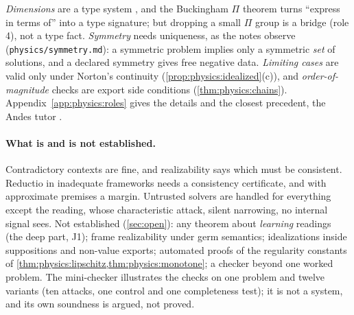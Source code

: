 \emph{Dimensions} are a type system \citep{kennedy1994dimension}, and the Buckingham $\Pi$
theorem \citep{buckingham1914physically} turns ``express in terms of'' into a type
signature; but dropping a small $\Pi$ group is a bridge (role 4), not a type fact.
\emph{Symmetry} needs uniqueness, as the notes observe (\texttt{physics/symmetry.md}): a
symmetric problem implies only a symmetric \emph{set} of solutions, and a declared
symmetry gives free negative data. \emph{Limiting cases} are valid only under Norton's
continuity (\cref{prop:physics:idealized}(c)), and \emph{order-of-magnitude} checks are
export side conditions (\cref{thm:physics:chains}). Appendix~\ref{app:physics:roles}
gives the details and the closest precedent, the Andes tutor \citep{vanlehn2005andes}.

\paragraph{What is and is not established.} Contradictory contexts are fine, and
realizability says which must be consistent. Reductio in inadequate frameworks needs a
consistency certificate, and with approximate premises a margin. Untrusted solvers are
handled for everything except the reading, whose characteristic attack, silent narrowing,
no internal signal sees. Not established (\cref{sec:open}): any theorem about \emph{learning}
readings (the deep part, J1); frame realizability under germ semantics; idealizations inside
suppositions and non-value exports; automated proofs of the regularity constants of
\cref{thm:physics:lipschitz,thm:physics:monotone}; a checker beyond one worked problem. The
mini-checker illustrates the checks on one problem and twelve variants (ten attacks, one
control and one completeness test); it is not a system, and its own soundness is argued,
not proved.
